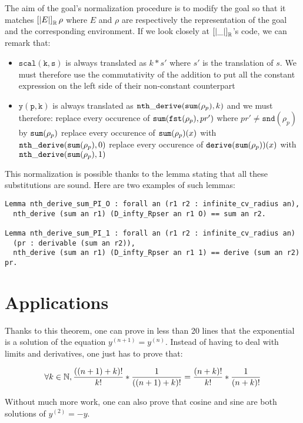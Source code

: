 \documentclass{article}
\begin{document}
The aim of the goal's normalization procedure is to modify the goal so that it
matches $\left[\left| E \right|\right]_{\mathbb{R}} \rho$ where $E$ and $\rho$ are
respectively the representation of the goal and the corresponding environment.
If we look closely at $\left[\left| \_ \right|\right]_{\mathbb{R}}$'s code, we can remark
that:
\begin{itemize}
\item $\mathtt{scal(k,s)}$ is always translated as $k * s'$ where $s'$ is the
  translation of $s$. We must therefore use the commutativity of the addition
  to put all the constant expression on the left side of their non-constant
  counterpart

\item $\mathtt{y(p,k)}$ is always translated as $\operatorname{\mathtt{nth\_derive}}(\operatorname{\mathtt{sum}}(\rho_p),k)$ and we must
  therefore:
  \subitem replace every occurence of $\operatorname{\mathtt{sum}} (\mathtt{fst} (\rho_p), pr')$ where
  $pr' \neq \mathtt{snd}(\rho_p)$ by $\operatorname{\mathtt{sum}}(\rho_p)$
  \subitem replace every occurence of $\operatorname{\mathtt{sum}} (\rho_p)(x)$ with $\operatorname{\mathtt{nth\_derive}}(\operatorname{\mathtt{sum}}(\rho_p),0)$
  \subitem replace every occurence of $\mathtt{derive}(\operatorname{\mathtt{sum}} (\rho_p))(x)$ with
  $\operatorname{\mathtt{nth\_derive}}(\operatorname{\mathtt{sum}}(\rho_p),1)$
\end{itemize}

This normalization is possible thanks to the lemma stating that all these
substitutions are sound. Here are two examples of such lemmas:

\begin{verbatim}
Lemma nth_derive_sum_PI_O : forall an (r1 r2 : infinite_cv_radius an),
  nth_derive (sum an r1) (D_infty_Rpser an r1 O) == sum an r2.

Lemma nth_derive_sum_PI_1 : forall an (r1 r2 : infinite_cv_radius an)
  (pr : derivable (sum an r2)),
  nth_derive (sum an r1) (D_infty_Rpser an r1 1) == derive (sum an r2) pr.
\end{verbatim}

\section{Applications}

Thanks to this theorem, one can prove in less than 20 lines that the
exponential is a solution of the equation $y^{(n+1)} = y^{(n)}$. Instead
of having to deal with limits and derivatives, one just has to prove that:

$$\forall k \in \mathbb{N}, \frac{((n+1) + k)!}{k!} * \frac{1}{((n+1)+k)!}
= \frac{(n+k)!}{k!} * \frac{1}{(n+k)!}$$

Without much more work, one can also prove that cosine and sine are
both solutions of $y^{(2)} = - y$.

\printbibliography{}


\end{document}
